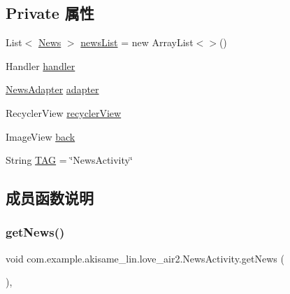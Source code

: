 \subsection*{Private 属性}
\begin{DoxyCompactItemize}
\item 
List$<$ \mbox{\hyperlink{classcom_1_1example_1_1akisame__lin_1_1love__air2_1_1_bean_1_1_news}{News}} $>$ \mbox{\hyperlink{classcom_1_1example_1_1akisame__lin_1_1love__air2_1_1_news_activity_aaafede59f9f97c7b9b8bc5310edf4f5e}{news\+List}} = new Array\+List$<$$>$()
\item 
Handler \mbox{\hyperlink{classcom_1_1example_1_1akisame__lin_1_1love__air2_1_1_news_activity_aca8ceba7f33429af22a1feed671a27b8}{handler}}
\item 
\mbox{\hyperlink{classcom_1_1example_1_1akisame__lin_1_1love__air2_1_1presenter_1_1_news_adapter}{News\+Adapter}} \mbox{\hyperlink{classcom_1_1example_1_1akisame__lin_1_1love__air2_1_1_news_activity_ab9598b1202925a0d40625513c7fec683}{adapter}}
\item 
Recycler\+View \mbox{\hyperlink{classcom_1_1example_1_1akisame__lin_1_1love__air2_1_1_news_activity_ad8981c71d70e712164ee35617a42819e}{recycler\+View}}
\item 
Image\+View \mbox{\hyperlink{classcom_1_1example_1_1akisame__lin_1_1love__air2_1_1_news_activity_a9414d3fa719337e5e76769660ff45185}{back}}
\item 
String \mbox{\hyperlink{classcom_1_1example_1_1akisame__lin_1_1love__air2_1_1_news_activity_abf0be5a72d91fa165e63661608e338a5}{T\+AG}} = \char`\"{}News\+Activity\char`\"{}
\end{DoxyCompactItemize}


\subsection{成员函数说明}
\mbox{\label{classcom_1_1example_1_1akisame__lin_1_1love__air2_1_1_news_activity_a23d5422990cc9eafb02246cddbc083ed}} 
\subsubsection{\texorpdfstring{getNews()}{getNews()}}
{\footnotesize\ttfamily void com.\+example.\+akisame\+\_\+lin.\+love\+\_\+air2.\+News\+Activity.\+get\+News (\begin{DoxyParamCaption}{ }\end{DoxyParamCaption})\hspace{0.3cm}{\ttfamily [inline]}, {\ttfamily [private]}}

